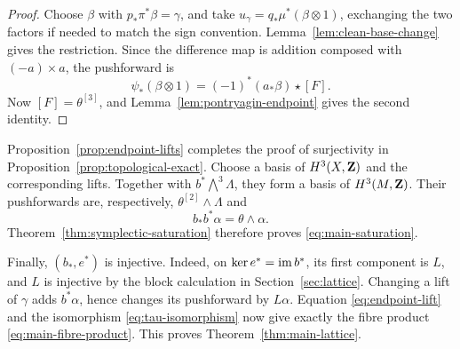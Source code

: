 \begin{proof}
Choose \(\beta\) with \(p_*\pi^*\beta=\gamma\), and take
\(u_\gamma=q_*\mu^*(\beta\otimes1)\), exchanging the two factors if needed
to match the sign convention.  Lemma~\ref{lem:clean-base-change} gives the
restriction.  Since the difference map is addition composed with
\((-a)\times a\), the pushforward is
\[
 \psi_*(\beta\otimes1)=(-1)^*(a_*\beta)\star[F].
\]
Now \([F]=\theta^{[3]}\), and
Lemma~\ref{lem:pontryagin-endpoint} gives the second identity.
\end{proof}

Proposition~\ref{prop:endpoint-lifts} completes the proof of surjectivity in
Proposition~\ref{prop:topological-exact}.  Choose a basis of \(H^3(X,\mathbf Z)\)
and the corresponding lifts.  Together with
\(b^*\bigwedge^3\Lambda\), they form a basis of \(H^3(M,\mathbf Z)\).  Their
pushforwards are, respectively,
\(\theta^{[2]}\wedge\Lambda\) and
\[
 b_*b^*\alpha=\theta\wedge\alpha.
\]
Theorem~\ref{thm:symplectic-saturation} therefore proves
\eqref{eq:main-saturation}.

Finally, \((b_*,e^*)\) is injective.  Indeed, on \(\ker e^*=\operatorname{im} b^*\), its
first component is \(L\), and \(L\) is injective by the block calculation
in Section~\ref{sec:lattice}.  Changing a lift of \(\gamma\) adds
\(b^*\alpha\), hence changes its pushforward by \(L\alpha\).  Equation
\eqref{eq:endpoint-lift} and the isomorphism \eqref{eq:tau-isomorphism} now
give exactly the fibre product \eqref{eq:main-fibre-product}.  This proves
Theorem~\ref{thm:main-lattice}.
